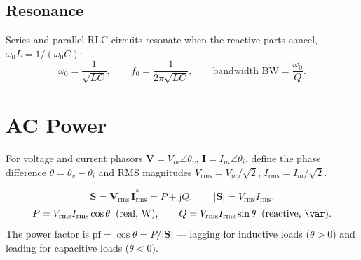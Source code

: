 \documentclass{essay}
\newcommand{\jj}{\mathrm{j}}
\begin{document}
\subsection{Resonance}
Series and parallel RLC circuits resonate when the reactive parts cancel,
\(\omega_{0} L = 1/(\omega_{0} C)\):
\[ \omega_{0} = \frac{1}{\sqrt{LC}}, \qquad f_{0} = \frac{1}{2\pi\sqrt{LC}}, \qquad \text{bandwidth } \mathrm{BW} = \frac{\omega_{0}}{Q}. \]

\section{AC Power}

For voltage and current phasors \(\mathbf{V}=V_{m}\angle\theta_{v}\),
\(\mathbf{I}=I_{m}\angle\theta_{i}\), define the phase difference
\(\theta = \theta_{v} - \theta_{i}\) and RMS magnitudes
\(V_{\mathrm{rms}}=V_{m}/\sqrt{2}\), \(I_{\mathrm{rms}}=I_{m}/\sqrt{2}\).

\[ \mathbf{S} = \mathbf{V}_{\mathrm{rms}}\,\mathbf{I}_{\mathrm{rms}}^{*} = P + \jj Q, \qquad |\mathbf{S}| = V_{\mathrm{rms}} I_{\mathrm{rms}}. \]
\[ P = V_{\mathrm{rms}} I_{\mathrm{rms}}\cos\theta \;\;(\text{real, \si{\watt}}), \qquad Q = V_{\mathrm{rms}} I_{\mathrm{rms}}\sin\theta \;\;(\text{reactive, \si{\var}}). \]
The power factor is \(\mathrm{pf} = \cos\theta = P/|\mathbf{S}|\) --- lagging for
inductive loads (\(\theta>0\)) and leading for capacitive loads (\(\theta<0\)).
\end{document}
